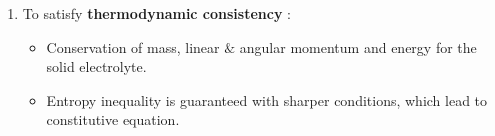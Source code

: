 \documentclass[25pt, a0paper,
portrait,
margin=5mm, innermargin=5mm, blockverticalspace=15mm, colspace=15mm, subcolspace=0mm]{tikzposter}
\begin{document}
\begin{columns}
{\begin{enumerate}
			\item To satisfy \textbf{thermodynamic consistency}%
			      :
			      \begin{itemize}
				      \item Conservation of mass, linear $\&$ angular momentum and energy for the solid electrolyte.
				      \item Entropy inequality is guaranteed with sharper conditions, which lead to constitutive equation.
			      \end{itemize}
		\end{enumerate}
	}

\end{columns}
\end{document}
